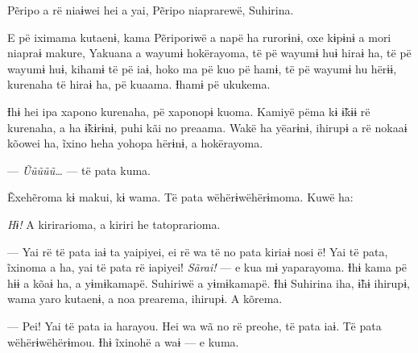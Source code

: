 Pẽripo a rë niaɨwei hei a yai, Pẽripo niaprarewë, Suhirina. 



E pë iximama kutaenɨ, kama Pẽriporiwë a napë ha rurorɨnɨ, oxe kɨpɨnɨ a
mori niapraɨ makure, Yakuana a wayumɨ hokërayoma, të pë wayumɨ huɨ hiraɨ
ha, të pë wayumɨ huɨ, kihamɨ të pë iaɨ, hoko ma pë kuo pë hamɨ, të pë
wayumɨ hu hërɨɨ, kurenaha të hiraɨ ha, pë kuaama. Ɨhamɨ pë ukukema. 

Ɨhɨ hei ipa xapono kurenaha, pë xaponopɨ kuoma. Kamiyë pëma kɨ ɨ̃kɨɨ rë
kurenaha, a ha ɨ̃kɨrɨnɨ, puhi kãi no preaama. Wakë ha yëarɨnɨ, ihirupɨ a
rë nokaaɨ kõowei ha, ĩxino heha yohopa hërɨnɨ, a hokërayoma. 


--- \textit{Ũũũũũ\ldots{}} --- të pata kuma. 

Ẽxehẽroma kɨ makui, kɨ wama. Të pata wëhërɨwëhërɨmoma. Kuwë ha:

\textit{Hɨ!} A kirirarioma, a kiriri he tatoprarioma. 

--- Yai rë të pata iaɨ ta yaipiyei, ei rë wa të no pata kiriaɨ nosi ë!
Yai të pata, ĩxinoma a ha, yai të pata rë iapiyei! \textit{Sãrai!} --- e kua mɨ
yaparayoma. Ɨhɨ kama pë hɨɨ a kõaɨ ha, a yɨmɨkamapë. Suhiriwë a
yɨmɨkamapë. Ɨhɨ Suhirina iha, ɨ̃hɨ ihirupɨ, wama yaro kutaenɨ, a noa
prearema, ihirupɨ. A kõrema.

--- Pei! Yai të pata ia harayou. Hei wa wã no rë preohe, të pata iaɨ. Të
pata wëhërɨwëhërɨmou. Ɨhɨ ĩxinohë a waɨ --- e kuma. 

